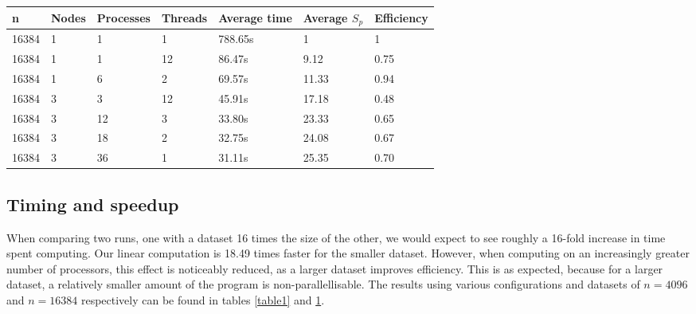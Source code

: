 \begin{table}[h]
   \centering
    \begin{tabular}{| l | l | l | l | l | l | l |}
    \hline
    \bf{n} & \bf{Nodes} & \bf{Processes} &\bf{Threads} & \bf{Average time} & \bf{Average }$S_{p}$ & \bf{Efficiency} \\ \hline
    	16384 & 1 & 1 & 1 & 788.65s & 1 & 1 \\ \hline
	16384 & 1 & 1 & 12 & 86.47s & 9.12 & 0.75 \\ \hline
	16384 & 1 & 6 & 2 & 69.57s & 11.33 & 0.94 \\ \hline
	16384 & 3 & 3 & 12 & 45.91s & 17.18 & 0.48 \\ \hline
	16384 & 3 & 12 & 3 & 33.80s & 23.33 & 0.65 \\ \hline
	16384 & 3 & 18 & 2 & 32.75s & 24.08 & 0.67 \\ \hline	
	16384 & 3 & 36 & 1 & 31.11s & 25.35 & 0.70  \\ \hline
    \end{tabular}
	\label{table2}
\end{table}



\subsection{Timing and speedup}
When comparing two runs, one with a dataset 16 times the size of the other, we would expect to see roughly a 16-fold increase in time spent computing. Our linear computation is 18.49 times faster for the smaller dataset. However, when computing on an increasingly greater number of processors, this effect is noticeably reduced, as a larger dataset improves efficiency. This is as expected, because for a larger dataset, a relatively smaller amount of the program is non-parallellisable. The results using various configurations and datasets of $n = 4096$ and $n = 16384$ respectively can be found in tables \ref{table1} and \ref{table2}.

